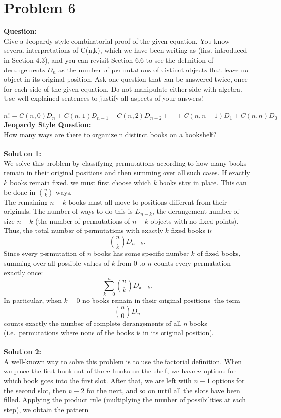 \documentclass{article}
\begin{document}
\section*{Problem 6}
\textbf{Question:}\\ Give a Jeopardy-style combinatorial proof of the given equation. You know several interpretations of C(n,k), which we have been writing as
(first introduced in Section 4.3), and you can revisit Section 6.6 to see the definition of derangements $D_n$ as the number of permutations of distinct objects that leave no object in its original position. Ask one question that can be answered twice, once for each side of the given equation.  Do not manipulate either side with algebra. Use well-explained sentences to justify all aspects of your answers! \\\\
\[
n! = C(n,0)D_n + C(n,1)D_{n-1} + C(n,2) D_{n-2} + \cdots + C(n,n-1)D_1 + C(n,n)D_0
\]
\textbf{Jeopardy Style Question:}\\
How many ways are there to organize n distinct books on a bookshelf?\\\\
\textbf{Solution 1:}\\
We solve this problem by classifying permutations according to how many books remain in their original positions and then summing over all such cases.
If exactly $k$ books remain fixed, we must first choose which $k$ books stay in place. This can be done in $\binom{n}{k}$ ways.\\
The remaining $n-k$ books must all move to positions different from their originals. The number of ways to do this is $D_{n-k}$, the derangement number of size $n-k$ (the number of permutations of $n-k$ objects with no fixed points).\\
Thus, the total number of permutations with exactly $k$ fixed books is
\[
\binom{n}{k}D_{n-k}.
\]
Since every permutation of $n$ books has some specific number $k$ of fixed books, summing over all possible values of $k$ from $0$ to $n$ counts every permutation exactly once:
\[
\sum_{k=0}^{n}\binom{n}{k}D_{n-k}.
\]
In particular, when $k=0$ no books remain in their original positions; the term
\[
\binom{n}{0}D_{n}
\]
counts exactly the number of complete derangements of all $n$ books (i.e.\ permutations where none of the books is in its original position).\\\\
\textbf{Solution 2:}\\
A well-known way to solve this problem is to use the factorial definition. When we place the first book out of the $n$ books on the shelf, we have $n$ options for which book goes into the first slot. After that, we are left with $n-1$ options for the second slot, then $n-2$ for the next, and so on until all the slots have been filled. Applying the product rule (multiplying the number of possibilities at each step), we obtain the pattern  
\end{document}
